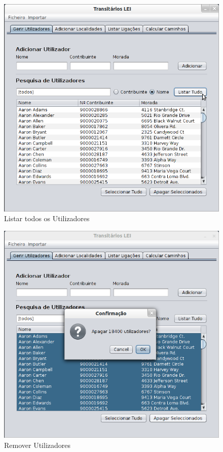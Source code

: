 \documentclass[a5paper,twocolumn, 11pt]{article}
\begin{document}
\begin{figure}[h!b!t!]
    \caption[Utilizadores: Listar Todos]{Listar todos os Utilizadores}
    \centering
        \includegraphics[width=330pt]{interface_3.png}
\end{figure}
\begin{figure}[h!b!t!]
    \caption[Utilizadores: Eliminar]{Remover Utilizadores}
    \centering
        \includegraphics[width=330pt]{interface_4.png}
\end{figure}
\end{document}
